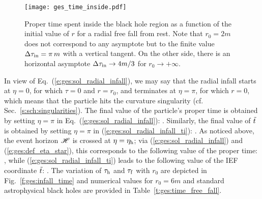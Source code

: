 \begin{figure}
\centerline{\texttt{[image: ges\_time\_inside.pdf]}}
\caption[]{\label{f:ges:time_inside} \footnotesize
Proper time spent inside the black hole region as a function
of the initial value of $r$ for a radial free fall from rest.
Note that $r_0=2m$ does not correspond to any asymptote but to the
finite value $\Delta\tau_{\rm in} = \pi\, m$ with a vertical tangent.
On the other side, there is an horizontal asymptote
$\Delta\tau_{\rm in} \to 4m/3$ for $r_0\to +\infty$.}
\end{figure}

In view of Eq.~(\ref{e:ges:sol_radial_infall}), we may say that the radial
infall starts at $\eta=0$, for which $\tau=0$ and $r=r_0$, and terminates
at $\eta=\pi$, for which $r=0$, which means that the particle hits the curvature
singularity (cf. Sec.~\ref{s:sch:singularities}).
The final value of the particle's proper time is obtained by
setting $\eta=\pi$ in Eq.~(\ref{e:ges:sol_radial_infall}):
\be
     .
\ee
Similarly, the final value of ${\tilde t}$ is obtained by setting $\eta=\pi$ in (\ref{e:ges:sol_radial_infall_ti}):
\be
     .
\ee
As noticed above, the event horizon $\mathscr{H}$ is crossed at $\eta=\eta_{\rm h}$;
via (\ref{e:ges:sol_radial_infall}) and (\ref{e:ges:def_eta_star}), this corresponds to the following value
of the proper time:
\be
     ,
\ee
while (\ref{e:ges:sol_radial_infall_ti}) leads to the following value
of the IEF coordinate ${\tilde t}$:
\be
     .
\ee
The variation of $\tau_{\rm h}$ and $\tau_{\rm f}$ with $r_0$ are depicted in
Fig.~\ref{f:ges:infall_time} and numerical values for $r_0=6m$ and
standard astrophysical black holes are provided in
Table~\ref{t:ges:time_free_fall}.

